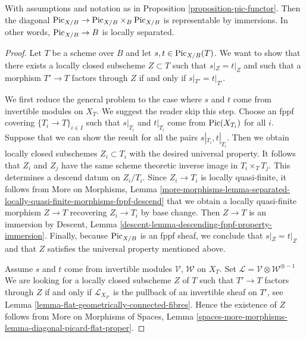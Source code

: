 \begin{lemma}
\label{lemma-diagonal-pic}
With assumptions and notation as in Proposition \ref{proposition-pic-functor}.
Then the diagonal
$\mathrm{Pic}_{X/B} \to \mathrm{Pic}_{X/B} \times_B \mathrm{Pic}_{X/B}$
is representable by immersions. In other words, $\mathrm{Pic}_{X/B} \to B$
is locally separated.
\end{lemma}

\begin{proof}
Let $T$ be a scheme over $B$ and let $s, t \in \mathrm{Pic}_{X/B}(T)$.
We want to show that there exists a locally closed subscheme $Z \subset T$
such that $s|_Z = t|_Z$ and such that a morphism $T' \to T$ factors
through $Z$ if and only if $s|_{T'} = t|_{T'}$.

\medskip\noindent
We first reduce the general problem to the case where $s$ and $t$ come
from invertible modules on $X_T$. We suggest the reader skip this step.
Choose an fppf covering $\{T_i \to T\}_{i \in I}$ such that
$s|_{T_i}$ and $t|_{T_i}$ come from $\mathop{\mathrm{Pic}}\nolimits(X_{T_i})$ for all $i$.
Suppose that we can show the result for all the pairs
$s|_{T_i}, t|_{T_i}$. Then we obtain locally closed subschemes
$Z_i \subset T_i$ with the desired universal property.
It follows that $Z_i$ and $Z_j$ have the same scheme theoretic
inverse image in $T_i \times_T T_j$.
This determines a descend datum on $Z_i/T_i$.
Since $Z_i \to T_i$ is locally quasi-finite, it follows from
More on Morphisms, Lemma
\ref{more-morphisms-lemma-separated-locally-quasi-finite-morphisms-fppf-descend}
that we obtain a locally quasi-finite morphism $Z \to T$
recovering $Z_i \to T_i$ by base change. Then $Z \to T$ is an immersion
by Descent, Lemma \ref{descent-lemma-descending-fppf-property-immersion}.
Finally, because $\mathrm{Pic}_{X/B}$ is an fppf sheaf, we conclude
that $s|_Z = t|_Z$ and that $Z$ satisfies the universal property
mentioned above.

\medskip\noindent
Assume $s$ and $t$ come from invertible modules $\mathcal{V}$, $\mathcal{W}$
on $X_T$.
Set $\mathcal{L} = \mathcal{V} \otimes \mathcal{W}^{\otimes -1}$
We are looking for a locally closed subscheme $Z$ of $T$
such that $T' \to T$ factors through $Z$ if and only if $\mathcal{L}_{X_{T'}}$
is the pullback of an invertible sheaf on $T'$, see
Lemma \ref{lemma-flat-geometrically-connected-fibres}.
Hence the existence of $Z$ follows from
More on Morphisms of Spaces, Lemma
\ref{spaces-more-morphisms-lemma-diagonal-picard-flat-proper}.
\end{proof}











